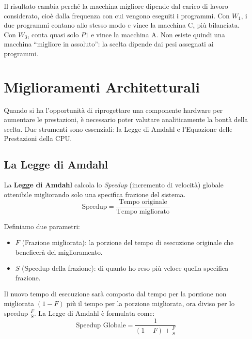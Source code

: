 \begin{example}
Il risultato cambia perché la macchina migliore dipende dal carico di lavoro considerato, cioè dalla frequenza con cui vengono eseguiti i programmi. Con \(W_1\), i due programmi contano allo stesso modo e vince la macchina C, più bilanciata. Con \(W_3\), conta quasi solo \(P1\) e vince la macchina A. Non esiste quindi una macchina ``migliore in assoluto'': la scelta dipende dai pesi assegnati ai programmi.
\end{example}

\section{Miglioramenti Architetturali}

Quando si ha l'opportunità di riprogettare una componente hardware per aumentare le prestazioni, è necessario poter valutare analiticamente la bontà della scelta. Due strumenti sono essenziali: la Legge di Amdahl e l'Equazione delle Prestazioni della CPU.

\subsection{La Legge di Amdahl}
La \textbf{Legge di Amdahl} calcola lo \textit{Speedup} (incremento di velocità) globale ottenibile migliorando solo una specifica frazione del sistema.
\[ \text{Speedup} = \frac{\text{Tempo originale}}{\text{Tempo migliorato}} \]

Definiamo due parametri:
\begin{itemize}
    \item \( F \) (Frazione migliorata): la porzione del tempo di esecuzione originale che beneficerà del miglioramento.
    \item \( S \) (Speedup della frazione): di quanto ho reso più veloce quella specifica frazione.
\end{itemize}

Il nuovo tempo di esecuzione sarà composto dal tempo per la porzione non migliorata \((1 - F)\) più il tempo per la porzione migliorata, ora diviso per lo speedup \(\frac{F}{S}\). 
La Legge di Amdahl è formulata come:
\begin{equation}
\text{Speedup Globale} = \frac{1}{(1 - F) + \frac{F}{S}}
\end{equation}

